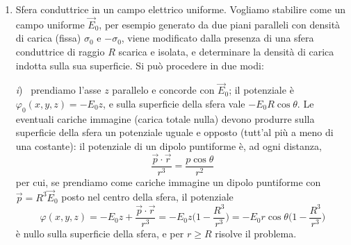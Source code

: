 \begin{enumerate}
    sfera, \`e la carica immagine del problema.\\
    Il potenziale in un punto $P$ esterno al conduttore \`e
    \begin{equation}
      \varphi(x,y,z)=\frac qr-\frac{qR}{lr'}
      \tag{2.37}
    \end{equation}
    dove $r$ ed $r'$, indicate nella figura 2.10, sono le distanze di $P$ da $q$
    e dalla posizione della carica immagine $q'$. La carica totale indotta sulla
    sfera \`e $q'=-q\,R/l$. Si noti che se $q$ si allontana, $q'$ si avvicina al
    centro.\\
    Supponiamo ora che la sfera, anzich\`e a potenziale zero, sia una sfera
    scarica e isolata, cio\`e la sua carica totale \`e nulla: se aggiungiamo al
    sistema un'altra carica immagine $-q'$ nel centro della sfera, la superficie
    della sfera resta equipotenziale (a potenziale $\varphi_0=-q'/R=q/l$), e la
    carica totale sulla sfera \`e nulla. In questo caso il potenziale fuori dal
    conduttore \`e
    \begin{equation}
      \varphi(x,y,z)=\frac qr-\frac{qR}{lr'}+\frac{qR}{lr_0}
      \tag{2.37}
    \end{equation}
    dove $r_0$ \`e la distanza del punto $P$ dal centro della sfera. In
    generale, una opportuna carica nel centro permette di soddisfare qualsiasi
    condizione al contorno sulla sfera.
  \item Sfera conduttrice in un campo elettrico uniforme. Vogliamo stabilire
    come un campo uniforme $\vec E_0$, per esempio generato da due piani
    paralleli con densit\`a di carica (fissa) $\sigma_0$ e $-\sigma_0$, viene
    modificato dalla presenza di una sfera conduttrice di raggio $R$ scarica e
    isolata, e determinare la densit\`a di carica indotta sulla sua superficie.
    Si pu\`o procedere in due modi:

    \textit{i}) \ prendiamo l'asse $z$ parallelo e concorde con $\vec E_0$; il
    potenziale \`e \ $\varphi_0(x,y,z)=-E_0z$, e sulla superficie della sfera
    vale $-E_0R\cos\theta$. Le eventuali cariche immagine (carica totale nulla)
    devono produrre sulla superficie della sfera un potenziale uguale e opposto
    (tutt'al pi\`u a meno di una costante): il potenziale di un dipolo
    puntiforme \`e, ad ogni distanza,
    \[
      \frac{\vec p\cdot\vec r}{r^3}=\frac{p\cos\theta}{r^2}
    \]
    per cui, se prendiamo come cariche immagine un dipolo puntiforme con
    $\vec p=R^3\vec E_0$ posto nel centro della sfera, il potenziale
    \begin{equation}
      \varphi(x,y,z)=-E_0z+\frac{\vec p\cdot\vec r}{r^3}
      =-E_0z\Big(1-\frac{R^3}{r^3}\Big)
      =-E_0r\cos\theta\Big(1-\frac{R^3}{r^3}\Big)
      \tag{2.38}
    \end{equation}
    \`e nullo sulla superficie della sfera, e per $r\ge R$ risolve il problema.


\end{enumerate}
